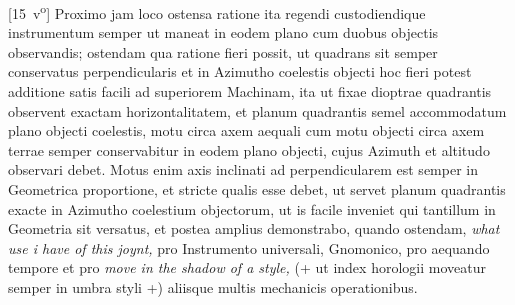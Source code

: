 \hspace{-1.2mm}[15~v\textsuperscript{o}] Proximo jam loco ostensa ratione ita regendi custodiendique instrumentum semper ut maneat in eodem plano cum duobus objectis observandis; ostendam qua ratione fieri possit, ut quadrans sit semper conservatus perpendicularis et in Azimutho\protect{} coelestis objecti hoc fieri potest additione satis facili ad superiorem Machinam, ita ut fixae dioptrae\protect{} quadrantis\protect{} observent exactam horizontalitatem, et planum quadrantis\protect{} semel accommodatum plano objecti coelestis, motu circa axem aequali cum motu objecti circa axem terrae semper conservabitur in eodem plano objecti, cujus Azimuth\protect{} et altitudo observari debet. Motus enim axis inclinati ad perpendicularem est semper in Geometrica proportione, et stricte qualis esse debet, ut servet planum quadrantis\protect{} exacte in Azimutho\protect{} coelestium objectorum, ut is facile inveniet qui tantillum in Geometria sit versatus, et postea amplius demonstrabo, quando ostendam, \textit{what use i have of this joynt,} pro Instrumento universali, Gnomonico, pro aequando tempore et pro  \textit{move in the shadow of a style,} (+ ut index horologii moveatur semper in umbra styli +) aliisque multis mechanicis operationibus. 
\pend 
\count{}
\count{}
\count{} 
